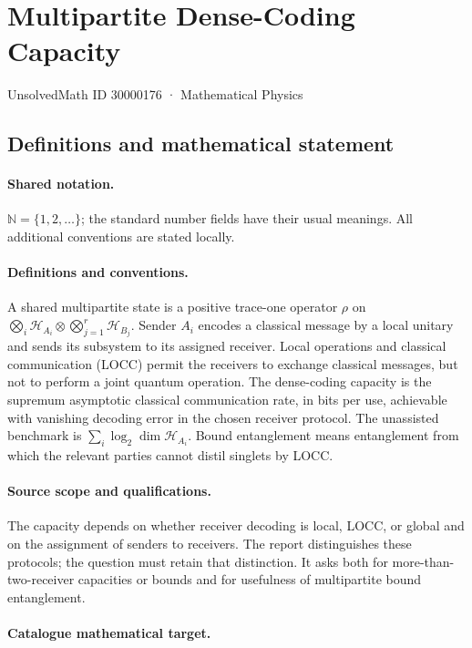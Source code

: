 \documentclass[11pt]{article}
\begin{document}
\setcounter{section}{30000175}
\section{Multipartite Dense-Coding Capacity}\label{30000176}
{\small UnsolvedMath ID 30000176 · Mathematical Physics}
\subsection{Definitions and mathematical statement}

\paragraph{Shared notation.}$\mathbb N=\{1,2,\ldots\}$; the standard number fields have their usual meanings. All additional conventions are stated locally.


\paragraph{Definitions and conventions.} A shared multipartite state is a positive trace-one operator $\rho$ on $\bigotimes_i\mathcal H_{A_i}\otimes\bigotimes_{j=1}^r\mathcal H_{B_j}$. Sender $A_i$ encodes a classical message by a local unitary and sends its subsystem to its assigned receiver. Local operations and classical communication (LOCC) permit the receivers to exchange classical messages, but not to perform a joint quantum operation. The dense-coding capacity is the supremum asymptotic classical communication rate, in bits per use, achievable with vanishing decoding error in the chosen receiver protocol. The unassisted benchmark is $\sum_i\log_2\dim\mathcal H_{A_i}$. Bound entanglement means entanglement from which the relevant parties cannot distil singlets by LOCC.

\paragraph{Source scope and qualifications.} The capacity depends on whether receiver decoding is local, LOCC, or global and on the assignment of senders to receivers. The report distinguishes these protocols; the question must retain that distinction. It asks both for more-than-two-receiver capacities or bounds and for usefulness of multipartite bound entanglement.

\paragraph{Catalogue mathematical target.}
\end{document}
